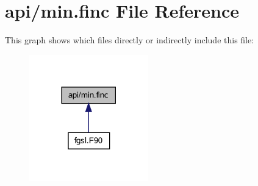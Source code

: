 \hypertarget{min_8finc}{}\section{api/min.finc File Reference}
\label{min_8finc}
This graph shows which files directly or indirectly include this file\+:\nopagebreak
\begin{figure}[H]
\begin{center}
\leavevmode
\includegraphics[width=146pt]{min_8finc__dep__incl}
\end{center}
\end{figure}
